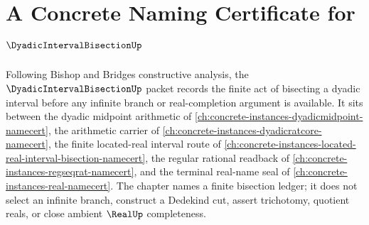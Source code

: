 \chapter{A Concrete Naming Certificate for $\DyadicIntervalBisectionUp$}
\label{ch:concrete-instances-dyadic-interval-bisection-namecert}

Following Bishop and Bridges constructive analysis, the $\DyadicIntervalBisectionUp$ packet records the finite act of bisecting a dyadic interval before any infinite branch or real-completion argument is available. It sits between the dyadic midpoint arithmetic of \autoref{ch:concrete-instances-dyadicmidpoint-namecert}, the arithmetic carrier of \autoref{ch:concrete-instances-dyadicratcore-namecert}, the finite located-real interval route of \autoref{ch:concrete-instances-located-real-interval-bisection-namecert}, the regular rational readback of \autoref{ch:concrete-instances-regseqrat-namecert}, and the terminal real-name seal of \autoref{ch:concrete-instances-real-namecert}. The chapter names a finite bisection ledger; it does not select an infinite branch, construct a Dedekind cut, assert trichotomy, quotient reals, or close ambient $\RealUp$ completeness.


